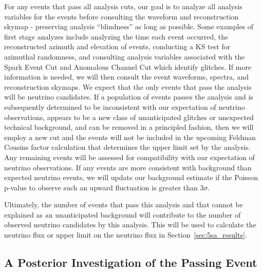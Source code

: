       For any events that pass all analysis cuts, our goal is to analyze all analysis variables for the events before consulting the waveform and reconstruction skymap - preserving analysis ``blindness'' as long as possible. 
      Some examples of first stage analyzes include analyzing the time each event occurred, the reconstructed azimuth and elevation of events, conducting a KS test for azimuthal randomness, and consulting analysis variables associated with the Spark Event Cut and Anomalous Channel Cut which identify glitches. 
      If more information is needed, we will then consult the event waveforms, spectra, and reconstruction skymaps. 
      We expect that the only events that pass the analysis will be neutrino candidates.
      If a population of events passes the analysis and is subsequently determined to be inconsistent with our expectation of neutrino observations, appears to be a new class of unanticipated glitches or unexpected technical background, and can be removed in a principled fashion, then we will employ a new cut and the events will not be included in the upcoming Feldman Cousins factor calculation that determines the upper limit set by the analysis. 
      Any remaining events will be assessed for compatibility with our expectation of neutrino observations. %
      If any events are more consistent with background than expected neutrino events, we will update our background estimate if the Poisson p-value to observe such an upward fluctuation is greater than $3\sigma$.

      Ultimately, the number of events that pass this analysis and that cannot be explained as an unanticipated background will contribute to the number of observed neutrino candidates by this analysis.
      This will be used to calculate the neutrino flux or upper limit on the neutrino flux in Section~\ref{sec:5sa_results}.

    \subsection{A Posterior Investigation of the Passing Event}

